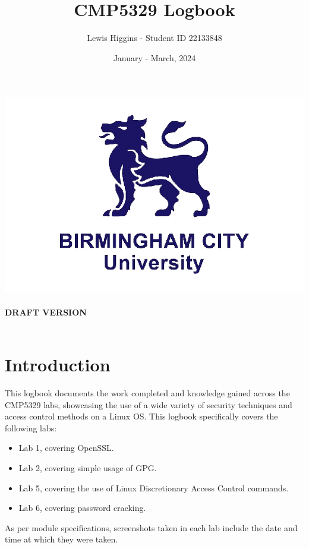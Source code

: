 \documentclass[12pt]{report}
\title{CMP5329 Logbook}
\author{Lewis Higgins - Student ID 22133848}
\date{January - March, 2024}
\begin{document}
    \pagecolor{yellow}

    \makeatletter
    \begin{titlepage}
        \begin{center}
            \includegraphics[width=0.7\linewidth]{bcu logo}\\[4ex]
            {\huge \bfseries  \@title }\\[2ex]
            {\huge \bfseries  DRAFT VERSION }\\[2ex]
            {\@author}\\[50ex]
            {\large \@date}
        \end{center}
    \end{titlepage}
    \makeatother
    \thispagestyle{empty}
    \newpage

    \pagecolor{white}

    \tableofcontents
    \chapter*{Introduction}\label{ch:introduction}

    This logbook documents the work completed and knowledge gained across the CMP5329 labs, showcasing
    the use of a wide variety of security techniques and access control methods on a Linux OS\@.
    This logbook specifically covers the following labs:
    \begin{itemize}
        \item Lab 1, covering OpenSSL\@.
        \item Lab 2, covering simple usage of GPG\@.
        \item Lab 5, covering the use of Linux Discretionary Access Control commands.
        \item Lab 6, covering password cracking.
    \end{itemize}

    As per module specifications, screenshots taken in each lab
    include the date and time at which they were taken.
\end{document}
